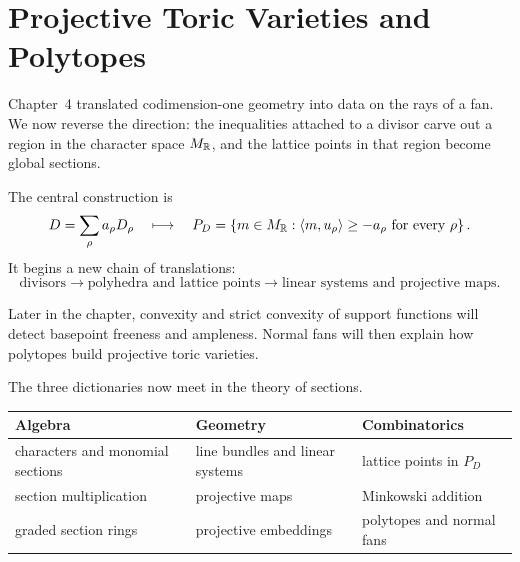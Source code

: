 \chapter[Projective Toric Varieties and Polytopes]
{Projective Toric Varieties and\\ Polytopes}
\label{chap:projective-toric-varieties-polytopes}

\begin{chapteroverview}
Chapter~4 translated codimension-one geometry into data on the rays of
a fan. We now reverse the direction: the inequalities attached to a
divisor carve out a region in the character space \(M_{\mathbb{R}}\), and the
lattice points in that region become global sections.

The central construction is
\[
D=\sum_\rho a_\rho D_\rho
\quad\longmapsto\quad
P_D
=
\left\{
 m\in M_{\mathbb{R}}:
 \langle m,u_\rho\rangle\geq-a_\rho
 \text{ for every }\rho
\right\}.
\]
It begins a new chain of translations:
\[
\boxed{
\text{divisors}
\longrightarrow
\text{polyhedra and lattice points}
\longrightarrow
\text{linear systems and projective maps}.
}
\]

Later in the chapter, convexity and strict convexity of support
functions will detect basepoint freeness and ampleness. Normal fans
will then explain how polytopes build projective toric varieties.
\end{chapteroverview}

\begin{threedictionaries}
The three dictionaries now meet in the theory of sections.

\medskip

\begin{center}
\small
\begin{tabularx}{\linewidth}{@{}
  >{\raggedright\arraybackslash}X
  >{\raggedright\arraybackslash}X
  >{\raggedright\arraybackslash}X@{}}
\toprule
\textbf{Algebra}
&
\textbf{Geometry}
&
\textbf{Combinatorics}
\\
\midrule
characters and monomial sections
&
line bundles and linear systems
&
lattice points in \(P_D\)
\\
section multiplication
&
projective maps
&
Minkowski addition
\\
graded section rings
&
projective embeddings
&
polytopes and normal fans
\\
\bottomrule
\end{tabularx}
\end{center}
\end{threedictionaries}

